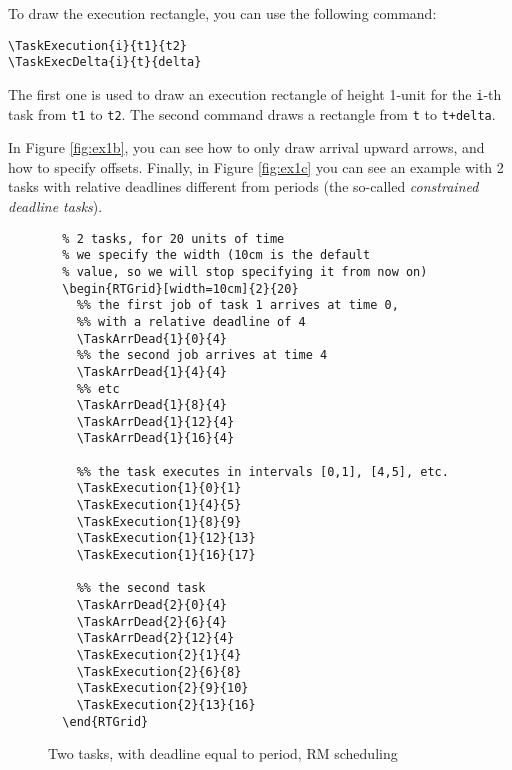\documentclass{article}
\begin{document}
To draw the execution rectangle, you can use the following command:
\begin{verbatim}
\TaskExecution{i}{t1}{t2}
\TaskExecDelta{i}{t}{delta}
\end{verbatim}
The first one is used to draw an execution rectangle of height 1-unit
for the \texttt{i}-th task from \texttt{t1} to \texttt{t2}. The second
command draws a rectangle from \texttt{t} to \texttt{t+delta}.

In Figure \ref{fig:ex1b}, you can see how to only draw arrival upward
arrows, and how to specify offsets. Finally, in Figure \ref{fig:ex1c}
you can see an example with 2 tasks with relative deadlines different
from periods (the so-called \emph{constrained deadline tasks}).

\begin{figure}[!htbp]
  \centering
  \begin{RTGrid}[width=10cm]{2}{20}


  \end{RTGrid}
\begin{verbatim}
  % 2 tasks, for 20 units of time
  % we specify the width (10cm is the default
  % value, so we will stop specifying it from now on)
  \begin{RTGrid}[width=10cm]{2}{20}
    %% the first job of task 1 arrives at time 0, 
    %% with a relative deadline of 4 
    \TaskArrDead{1}{0}{4}     
    %% the second job arrives at time 4
    \TaskArrDead{1}{4}{4}
    %% etc
    \TaskArrDead{1}{8}{4}
    \TaskArrDead{1}{12}{4}
    \TaskArrDead{1}{16}{4}

    %% the task executes in intervals [0,1], [4,5], etc.
    \TaskExecution{1}{0}{1}
    \TaskExecution{1}{4}{5}
    \TaskExecution{1}{8}{9}
    \TaskExecution{1}{12}{13}
    \TaskExecution{1}{16}{17}

    %% the second task
    \TaskArrDead{2}{0}{4}
    \TaskArrDead{2}{6}{4}
    \TaskArrDead{2}{12}{4}
    \TaskExecution{2}{1}{4}
    \TaskExecution{2}{6}{8}
    \TaskExecution{2}{9}{10}
    \TaskExecution{2}{13}{16}
  \end{RTGrid}
\end{verbatim}
  \caption{Two tasks, with deadline equal to period, RM scheduling}
  \label{fig:ex1}
\end{figure}
\end{document}
